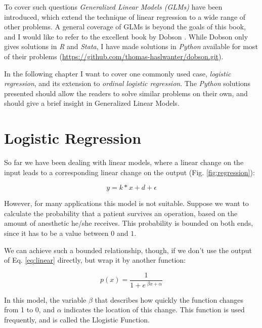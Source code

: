 To cover such questions \emph{Generalized Linear Models (GLMs)} have been introduced, which extend the technique of linear regression to a wide range of other problems. A general coverage of GLMs is beyond the goals of this book, and I would like to refer to the excellent book by Dobson \cite{Dobson2008}. While Dobson only gives solutions in \emph{R} and \emph{Stata}, I have made solutions in \emph{Python} available for most of their problems (\url{https://github.com/thomas-haslwanter/dobson.git}).

In the following chapter I want to cover one commonly used case, \emph{logistic regression}, and its extension to \emph{ordinal logistic regression}. The \emph{Python} solutions presented should allow the readers to solve similar problems on their own, and should give a brief insight in Generalized Linear Models.

\section{Logistic Regression}

So far we have been dealing with linear models, where a linear change on the input leads to a corresponding linear change on the output (Fig. \ref{fig:regression}):

 \begin{equation}\label{eq:linear}
   y = k*x + d + \epsilon
 \end{equation}

However, for many applications this model is not suitable. Suppose we want to calculate the probability that a patient survives an operation, based on the amount of anesthetic he/she receives. This probability is bounded on both ends, since it has to be a value between $0$ and $1$.

We can achieve such a bounded relationship, though, if we don't use the output of Eq. \ref{eq:linear} directly, but wrap it by another function:

\begin{equation}\label{eq:logisticFcn}
  p(x) = \frac{1}{ 1 + e^{ \;\beta x + \alpha } }
\end{equation}

In this model, the variable $\beta$ that describes how quickly the function changes from 1 to 0, and $\alpha$ indicates the location of this change. This function is used frequently, and is called the Llogistic Function.

